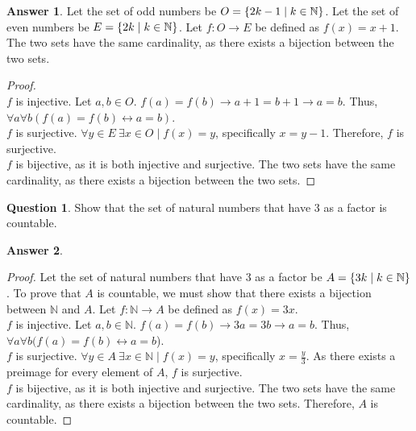 \documentclass[article, 12pt]{article}
\theoremstyle{definition}
\newtheorem{question}{Question}
\newtheorem{answer}{Answer}
\DeclarePairedDelimiter\set{\{}{\}}
\newcommand{\nats}{\mathbb{N}}
\begin{document}
    \begin{answer}
        Let the set of odd numbers be $O = \set*{2k - 1 \mid k \in \nats}$. Let the set of even numbers be $E = \set*{2k \mid k \in \nats}$. Let $f: O \to E$ be defined as $f(x) = x + 1$. The two sets have the same cardinality, as there exists a bijection between the two sets.
        \begin{proof} \ \\
            $f$ is injective. Let $a,b \in O$. $f(a) = f(b) \to a + 1 = b + 1 \to a = b$. Thus, \\ $\forall a \forall b(f(a) = f(b) \leftrightarrow a = b)$.
            \\[12pt]
            $f$ is surjective.  $\forall y \in E \ \exists x \in O \mid f(x) = y$, specifically $x = y-1$. Therefore, $f$ is surjective. 
            \\[12pt]
            $f$ is bijective, as it is both injective and surjective. The two sets have the same cardinality, as there exists a bijection between the two sets.
        \end{proof}
    \end{answer}

    \begin{question}
        Show that the set of natural numbers that have 3 as a factor is countable.
    \end{question}
    
    \begin{answer} \
        \begin{proof}
            Let the set of natural numbers that have 3 as a factor be $A = \set*{3k \mid k \in \nats}$. To prove that $A$ is countable, we must show that there exists a bijection between $\nats$ and $A$. Let $f: \nats \to A$ be defined as $f(x) = 3x$. 
            \\[12pt]
            $f$ is injective. Let $a,b \in \nats$. $f(a) = f(b) \to 3a = 3b \to a = b$. Thus, \\ $\forall a \forall b (f(a) = f(b) \leftrightarrow a = b$).
            \\[12pt]
            $f$ is surjective. $\forall y \in A \ \exists x \in \nats \mid f(x) = y$, specifically $x = \displaystyle\frac{y}{3}$. As there exists a preimage for every element of $A$, $f$ is surjective.
            \\[12pt]
            $f$ is bijective, as it is both injective and surjective. The two sets have the same cardinality, as there exists a bijection between the two sets. Therefore, $A$ is countable.
        \end{proof}
    \end{answer}
\end{document}
